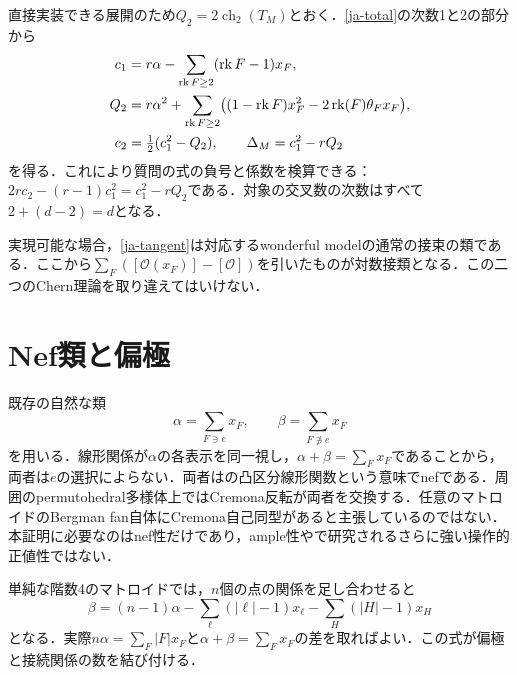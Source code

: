 \documentclass[12pt]{amsart}
\theoremstyle{definition}
\theoremstyle{remark}
\numberwithin{equation}{section}
\newcommand{\rk}{\operatorname{rk}}
\DeclareMathOperator{\ch}{ch}
\begin{document}
直接実装できる展開のため$Q_2=2\ch_2(T_M)$とおく．\eqref{ja-total}の次数1と2の部分から
\begin{align}\label{ja-c12}
 c_1&=r\alpha-\sum_{\rk F\geq2}(\rk F-1)x_F,\notag\\
 Q_2&=r\alpha^2+\sum_{\rk F\geq2}
       \bigl((1-\rk F)x_F^2-2\rk(F)\theta_Fx_F\bigr),\\
 c_2&=\tfrac12(c_1^2-Q_2),\qquad
 \Delta_M=c_1^2-rQ_2\notag
\end{align}
を得る．これにより質問の式の負号と係数を検算できる：$2r c_2-(r-1)c_1^2=c_1^2-rQ_2$である．対象の交叉数の次数はすべて$2+(d-2)=d$となる．

実現可能な場合，\eqref{ja-tangent}は対応するwonderful modelの通常の接束の類である．ここから$\sum_F([\mathcal O(x_F)]-[\mathcal O])$を引いたものが対数接類となる\cite[Section 3.2]{CheG}．この二つのChern理論を取り違えてはいけない．

\section{Nef類と偏極}
既存の自然な類
\begin{equation}\label{ja-ab}
 \alpha=\sum_{F\ni e}x_F,\qquad \beta=\sum_{F\not\ni e}x_F
\end{equation}
を用いる．線形関係が$\alpha$の各表示を同一視し，$\alpha+\beta=\sum_Fx_F$であることから，両者は$e$の選択によらない．両者は\cite[Definition 5.7 and Lemma 9.7]{AHK}の凸区分線形関数という意味でnefである．周囲のpermutohedral多様体上ではCremona反転が両者を交換する．任意のマトロイドのBergman fan自体にCremona自己同型があると主張しているのではない．本証明に必要なのはnef性だけであり，ample性や\cite{Che}で研究されるさらに強い操作的正値性ではない．

単純な階数4のマトロイドでは，$n$個の点の関係を足し合わせると
\begin{equation}\label{ja-beta-expand}
 \beta=(n-1)\alpha-\sum_\ell(|\ell|-1)x_\ell
                       -\sum_H(|H|-1)x_H
\end{equation}
となる．実際$n\alpha=\sum_F|F|x_F$と$\alpha+\beta=\sum_Fx_F$の差を取ればよい．この式が偏極と接続関係の数を結び付ける．
\end{document}
